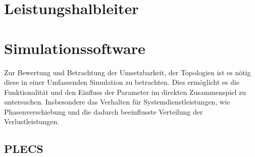 \section{Leistungshalbleiter}

\section{Simulationssoftware}
Zur Bewertung und Betrachtung der Umsetzbarkeit, der Topologien ist es nötig diese in einer Umfassenden Simulation zu betrachten. Dies ermöglicht es die Funktionalität und den Einfluss der Parameter im direkten Zusammenspiel zu untersuchen. Insbesondere das Verhalten für Systemdienstleistungen, wie Phasenverschiebung und die dadurch beeinflusste Verteilung der Verlustleistungen. 

	\subsection{PLECS}